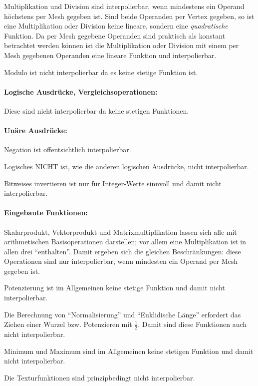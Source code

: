 \documentclass[twoside,a4paper,fleqn,12pt]{book}
\begin{document}
Multiplikation und Division sind interpolierbar, wenn mindestens ein Operand höchstens per Mesh gegeben ist.
Sind beide Operanden per Vertex gegeben, so ist eine Multiplikation oder Division keine lineare,
sondern eine \emph{quadratische} Funktion. Da per Mesh gegebene Operanden sind praktisch als
konstant betrachtet werden können ist die Multiplikation oder Division mit einem per Mesh gegebenen
Operanden eine lineare Funktion und interpolierbar.

Modulo ist nicht interpolierbar da es keine stetige Funktion ist.

\paragraph{Logische Ausdrücke, Vergleichsoperationen:} Diese sind nicht interpolierbar da keine stetigen Funktionen.

\paragraph{Unäre Ausdrücke:} Negation ist offentsichtlich interpolierbar.

Logisches NICHT ist, wie die anderen logischen Ausdrücke, nicht interpolierbar.

Bitweises invertieren ist nur für Integer-Werte sinnvoll und damit nicht interpolierbar.

\paragraph{Eingebaute Funktionen:} \label{split_builtins}
Skalarprodukt, Vektorprodukt und Matrixmultiplikation lassen sich alle mit arithmetischen Basisoperationen darstellen;
vor allem eine Multiplikation ist in allen drei "`enthalten"'. Damit ergeben sich die gleichen Beschränkungen:
diese Operationen sind nur interpolierbar, wenn mindesten ein Operand per Mesh gegeben ist.

Potenzierung ist im Allgemeinen keine stetige Funktion und damit nicht interpolierbar.

Die Berechnung von "`Normalisierung"' und "`Euklidische Länge"' erfordert das Ziehen einer Wurzel bzw. Potenzieren mit $\frac{1}{2}$.
Damit sind diese Funktionen auch nicht interpolierbar.

Minimum und Maximum sind im Allgemeinen keine stetigen Funktion und damit nicht interpolierbar.

Die Texturfunktionen sind prinzipbedingt nicht interpolierbar.
\end{document}
